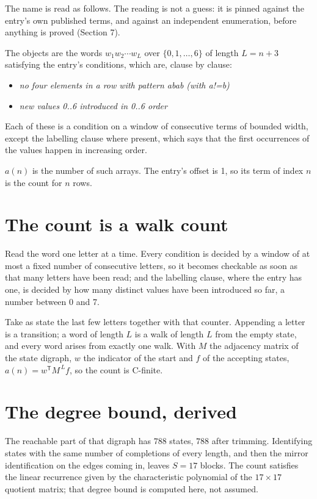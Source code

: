 \documentclass[11pt]{article}
\theoremstyle{definition}
\begin{document}
The name is read as follows. The reading is not a guess: it is pinned against the entry's own published terms, and against an independent enumeration, before anything is proved (Section 7).

The objects are the words $w_1 w_2 \cdots w_L$ over $\{0,1,\dots,6\}$ of length $L = n + 3$ satisfying the entry's conditions, which are, clause by clause:

\begin{itemize}

\item {\itshape no four elements in a row with pattern abab (with a!=b)}

\item {\itshape new values 0..6 introduced in 0..6 order}

\end{itemize}

Each of these is a condition on a window of consecutive terms of bounded width, except the labelling clause where present, which says that the first occurrences of the values happen in increasing order.

$a(n)$ is the number of such arrays. The entry's offset is 1, so its term of index $n$ is the count for $n$ rows.

\section{The count is a walk count}

Read the word one letter at a time. Every condition is decided by a window of at most a fixed number of consecutive letters, so it becomes checkable as soon as that many letters have been read; and the labelling clause, where the entry has one, is decided by how many distinct values have been introduced so far, a number between $0$ and 7.

Take as state the last few letters together with that counter. Appending a letter is a transition; a word of length $L$ is a walk of length $L$ from the empty state, and every word arises from exactly one walk. With $M$ the adjacency matrix of the state digraph, $w$ the indicator of the start and $f$ of the accepting states, $a(n) = w^{\mathsf T}M^{\,L}f$, so the count is C-finite.

\section{The degree bound, derived}

The reachable part of that digraph has $788$ states, $788$ after trimming. Identifying states with the same number of completions of every length, and then the mirror identification on the edges coming in, leaves $S = 17$ blocks. The count satisfies the linear recurrence given by the characteristic polynomial of the $17\times17$ quotient matrix; that degree bound is computed here, not assumed.
\end{document}
